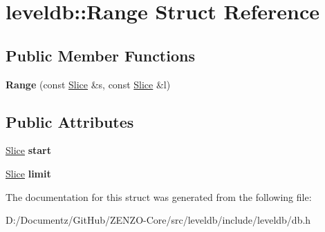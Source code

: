 \hypertarget{structleveldb_1_1_range}{}\section{leveldb\+::Range Struct Reference}
\label{structleveldb_1_1_range}
\subsection*{Public Member Functions}
\begin{DoxyCompactItemize}
\item 
\mbox{\label{structleveldb_1_1_range_a797d5e3b58cc615dfb805965d06bdcbf}} 
{\bfseries Range} (const \mbox{\hyperlink{classleveldb_1_1_slice}{Slice}} \&s, const \mbox{\hyperlink{classleveldb_1_1_slice}{Slice}} \&l)
\end{DoxyCompactItemize}
\subsection*{Public Attributes}
\begin{DoxyCompactItemize}
\item 
\mbox{\label{structleveldb_1_1_range_ad80a55e20eb7d864d497e8f94953c00d}} 
\mbox{\hyperlink{classleveldb_1_1_slice}{Slice}} {\bfseries start}
\item 
\mbox{\label{structleveldb_1_1_range_a9c45c46ac20a1c86c265f1f9c35d6632}} 
\mbox{\hyperlink{classleveldb_1_1_slice}{Slice}} {\bfseries limit}
\end{DoxyCompactItemize}


The documentation for this struct was generated from the following file\+:\begin{DoxyCompactItemize}
\item 
D\+:/\+Documentz/\+Git\+Hub/\+Z\+E\+N\+Z\+O-\/\+Core/src/leveldb/include/leveldb/db.\+h\end{DoxyCompactItemize}
